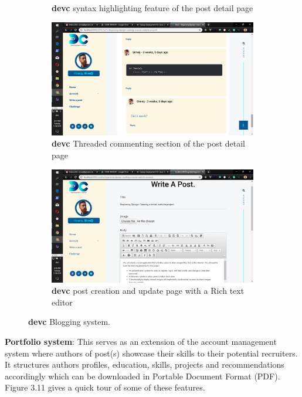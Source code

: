 \begin{itemize}
\begin{figure}[!htbp]
\begin{subfigure}[b]{0.45\textwidth}
		\caption{\textbf{devc} syntax highlighting feature of the post detail page}
	\end{subfigure}
	\medskip
	\begin{subfigure}[b]{0.45\textwidth}
		\centering
		\includegraphics[width=\linewidth]{./devccomments}
		\caption{\textbf{devc} Threaded commenting section of the post detail page}
	\end{subfigure}
	\hfill
	\begin{subfigure}[b]{0.45\textwidth}
		\centering
		\includegraphics[width=\linewidth]{./devcpostupdate}
		\caption{\textbf{devc} post creation and update page with a Rich text editor}
	\end{subfigure}
		\caption{\textbf{devc} Blogging system.}
	\end{figure}
	\subitem \textbf{Portfolio system}: This serves as an extension of the account management system where authors of post(s) showcase their skills to their potential recruiters. It structures authors profiles, education, skills, projects and recommendations accordingly which can be downloaded in Portable Document Format (PDF). Figure 3.11 gives a quick tour of some of these features.

\end{itemize}
